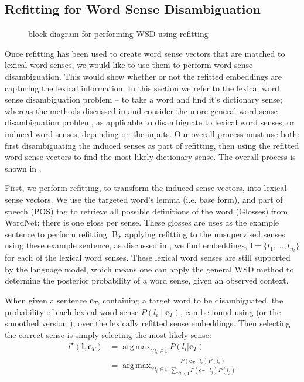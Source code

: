 \documentclass{sig-alternate}
\renewcommand{\c}{\mathbf{c}}
\renewcommand{\l}{\mathbf{l}}
\DeclareMathOperator*{\argmax}{arg\,max}
\begin{document}
\subsection{Refitting for Word Sense Disambiguation} 
\begin{figure}
	\begin{adjustbox}{max width=\columnwidth}
		
	\end{adjustbox}
	\caption{ block diagram for performing WSD using refitting \label{WSDBlock}} 
\end{figure}
Once refitting has been used to create word sense vectors that are matched to lexical word senses, we would like to use them to perform word sense disambiguation. This would show whether or not the refitted embeddings are capturing the lexical information. In this section we refer to the lexical word sense disambiguation problem -- to take a word and find it's dictionary sense; whereas the methods discussed in  and  consider the more general word sense disambiguation problem, as applicable to disambiguate to lexical word senses, or induced word senses, depending on the inputs.
Our overall process must use both: first disambiguating the induced senses as part of refitting, then using the refitted word sense vectors to find the most likely dictionary sense.
The overall process is shown in .

First, we perform refitting, to transform the induced sense vectors, into lexical sense vectors.
We use the targeted word's lemma (i.e. base form), and part of speech (POS) tag to retrieve all possible definitions of the word (Glosses) from WordNet; there is one gloss per sense. These glosses are uses as the example sentence to perform refitting. By applying refitting to the unsupervised senses using these example sentence, as discussed in , we find embeddings, $\l=\{l_1,..., l_{n_l}\}$ for each of the lexical word senses. These lexical word senses are still supported by the language model, which means one can apply the general WSD method to determine the posterior probability of a word sense, given an observed context. 

When given a sentence $\c_{T}$, containing a target word to be disambiguated, 
the probability of each lexical word sense $P(l_i \mid \c_{T})$, can be found using  (or the smoothed version ), over the lexically refitted sense embeddings. Then selecting the correct sense is simply selecting the most likely sense:
\begin{equation}
\begin{aligned}\label{eq:lexicalwsd}
l^\star (\l, \c_T) &= \argmax_{\forall l_i \in \l} P(l_i|\c_T) \\
&= \argmax_{\forall l_i \in \l} \frac{P(\c_T \mid l_i)P(l_i)}{\sum_{\forall l_j \in \l} P(\c_T \mid l_j)P(l_j)}
\end{aligned}
\end{equation}
\end{document}
